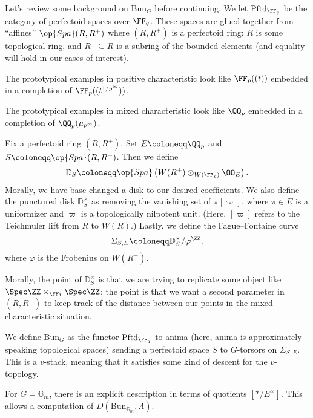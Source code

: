 \documentclass{article}
\begin{document}
Let's review some background on $\mathrm{Bun}_G$ before continuing. We let $\mathrm{Pftd}_{\FF_q}$ be the category of perfectoid spaces over $\FF_q$. These spaces are glued together from ``affines'' $\op{Spa}(R,R^+)$ where $(R,R^+)$ is a perfectoid ring: $R$ is some topological ring, and $R^+\subseteq R$ is a subring of the bounded elements (and equality will hold in our cases of interest).
\begin{example}
	The prototypical examples in positive characteristic look like $\FF_p((t))$ embedded in a completion of $\FF_p((t^{1/p^\infty}))$.
\end{example}
\begin{example}
	The prototypical examples in mixed characteristic look like $\QQ_p$ embedded in a completion of $\QQ_p(\mu_{p^\infty})$.
\end{example}
\begin{definition}
	Fix a perfectoid ring $(R,R^+)$. Set $E\coloneqq\QQ_p$ and $S\coloneqq\op{Spa}(R,R^+)$. Then we define
	\[\mathbb D_S\coloneqq\op{Spa}\left(W(R^+)\otimes_{W(\FF_p)}\OO_E\right).\]
	Morally, we have base-changed a disk to our desired coefficients. We also define the punctured disk $\mathbb D_S^\times$ as removing the vanishing set of $\pi[\varpi]$, where $\pi\in E$ is a uniformizer and $\varpi$ is a topologically nilpotent unit. (Here, $[\varpi]$ refers to the Teichmuler lift from $R$ to $W(R)$.) Lastly, we define the Fague--Fontaine curve
	\[\Sigma_{S,E}\coloneqq\mathbb D_S^\times/\varphi^\ZZ,\]
	where $\varphi$ is the Frobenius on $W(R^+)$.
\end{definition}
\begin{remark}
	Morally, the point of $\mathbb D_S^\times$ is that we are trying to replicate some object like $\Spec\ZZ\times_{\FF_1}\Spec\ZZ$: the point is that we want a second parameter in $(R,R^+)$ to keep track of the distance between our points in the mixed characteristic situation.
\end{remark}
\begin{definition}
	We define $\mathrm{Bun}_G$ as the functor $\mathrm{Pftd}_{\FF_q}$ to anima (here, anima is approximately speaking topological spaces) sending a perfectoid space $S$ to $G$-torsors on $\Sigma_{S,E}$. This is a $v$-stack, meaning that it satisfies some kind of descent for the $v$-topology.
\end{definition}
\begin{example}
	For $G=\mathbb G_m$, there is an explicit description in terms of quotients $[*/E^\times]$. This allows a computation of $D(\mathrm{Bun}_{\mathbb G_m},\Lambda)$.
\end{example}
\end{document}
